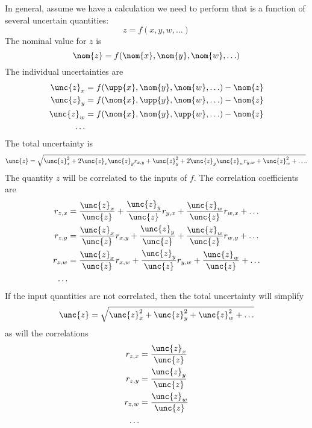 \documentclass[letterpaper,10pt]{article}
\begin{document}
In general, assume we have a calculation we need to perform that is a function of several uncertain quantities:
$$
z = f(x,y,w,\ldots)
$$
The nominal value for $z$ is
$$
\nom{z} = f(\nom{x},\nom{y},\nom{w},\ldots)
$$
The individual uncertainties are
$$
\begin{aligned}
\unc{z}_x &= f(\upp{x},\nom{y},\nom{w},\ldots) - \nom{z} \\
\unc{z}_y &= f(\nom{x},\upp{y},\nom{w},\ldots) - \nom{z} \\
\unc{z}_w &= f(\nom{x},\nom{y},\upp{w},\ldots) - \nom{z} \\
\ldots
\end{aligned}
$$
The total uncertainty is
$$
\unc{z} = \sqrt{ \unc{z}_x^2 + 2\unc{z}_x\unc{z}_y r_{x,y} + \unc{z}_y^2 + 2\unc{z}_y\unc{z}_wr_{y,w} + \unc{z}_w^2 + \ldots}.
$$
The quantity $z$ will be correlated to the inputs of $f$. The correlation coefficients are
$$
\begin{aligned}
r_{z,x} &= \frac{\unc{z}_x}{\unc{z}}
         + \frac{\unc{z}_y}{\unc{z}}r_{y,x}
         + \frac{\unc{z}_w}{\unc{z}}r_{w,x}
         + \ldots \\
r_{z,y} &= \frac{\unc{z}_x}{\unc{z}}r_{x,y}
         + \frac{\unc{z}_y}{\unc{z}}
         + \frac{\unc{z}_w}{\unc{z}}r_{w,y}
         + \ldots \\
r_{z,w} &= \frac{\unc{z}_x}{\unc{z}}r_{x,w}
         + \frac{\unc{z}_y}{\unc{z}}r_{y,w}
         + \frac{\unc{z}_w}{\unc{z}}
         + \ldots \\
\ldots
\end{aligned}
$$
If the input quantities are not correlated, then the total uncertainty will simplify
$$
\unc{z} = \sqrt{ \unc{z}_x^2 + \unc{z}_y^2 + \unc{z}_w^2 + \ldots}
$$
as will the correlations
$$
\begin{aligned}
r_{z,x} &= \frac{\unc{z}_x}{\unc{z}} \\
r_{z,y} &= \frac{\unc{z}_y}{\unc{z}} \\
r_{z,w} &= \frac{\unc{z}_w}{\unc{z}} \\
\ldots
\end{aligned}
$$
\end{document}

